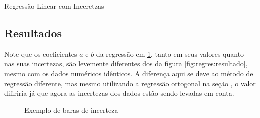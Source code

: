     \begin{listing}[H]
        \caption{Regressão Linear com Inceretzas}
        \label{code:incert:regres}

    \end{listing}


\subsection{Resultados}

    \begin{nota}
        Note que os coeficientes $a$ e $b$ da regressão em \ref{fig:incert:resultado}, tanto em seus valores quanto nas suas incertezas, são levemente diferentes dos da figura \ref{fig:regres:resultado}, mesmo com os dados numéricos idênticos. A diferença aqui se deve ao método de regressão diferente, mas mesmo utilizando a regressão ortogonal na seção , o valor difiriria já que agora as incertezas dos dados estão sendo levadas em conta.
    \end{nota}

    \begin{figure}[H]
        \centering
        

        \caption{Exemplo de baras de incerteza}
        \label{fig:incert:resultado}
    \end{figure}
